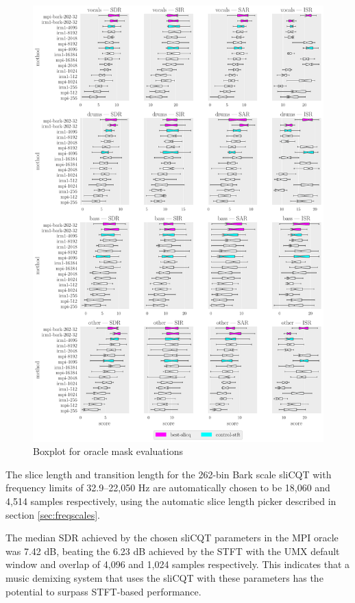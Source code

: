 \documentclass[report.tex]{subfiles}
\begin{document}
\begin{figure}[ht]
	\centering
	\includegraphics[width=\textwidth]{./images-bss/oracle_boxplot.pdf}
	\caption{Boxplot for oracle mask evaluations}
	\label{fig:oraclebssboxplot}
\end{figure}

The slice length and transition length for the 262-bin Bark scale sliCQT with frequency limits of 32.9--22,050 Hz are automatically chosen to be 18,060 and 4,514 samples respectively, using the automatic slice length picker described in section \ref{sec:freqscales}.

The median SDR achieved by the chosen sliCQT parameters in the MPI oracle was 7.42 dB, beating the 6.23 dB achieved by the STFT with the UMX default window and overlap of 4,096 and 1,024 samples respectively. This indicates that a music demixing system that uses the sliCQT with these parameters has the potential to surpass STFT-based performance.
\end{document}
